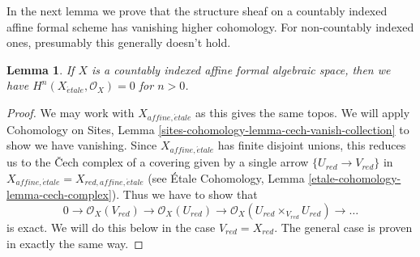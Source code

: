 \documentclass{stacks-project}
\theoremstyle{plain}
\newtheorem{lemma}[subsection]{Lemma}
\theoremstyle{definition}
\theoremstyle{remark}
\numberwithin{equation}{subsection}
\def\etale{{\acute{e}tale}}
\begin{document}
\noindent
In the next lemma we prove that the structure sheaf on a countably
indexed affine formal scheme has vanishing higher cohomology.
For non-countably indexed ones, presumably this generally doesn't hold.

\begin{lemma}
\label{lemma-higher-vanishing-structure-sheaf}
If $X$ is a countably indexed affine formal algebraic space, then
we have $H^n(X_\etale, \mathcal{O}_X) = 0$ for $n > 0$.
\end{lemma}

\begin{proof}
We may work with $X_{affine, \etale}$ as this gives the same topos.
We will apply Cohomology on Sites, Lemma
\ref{sites-cohomology-lemma-cech-vanish-collection}
to show we have vanishing. Since $X_{affine, \etale}$
has finite disjoint unions, this reduces us to the {\v C}ech
complex of a covering given by a single arrow $\{U_{red} \to V_{red}\}$
in $X_{affine, \etale} = X_{red, affine, \etale}$
(see \'Etale Cohomology, Lemma \ref{etale-cohomology-lemma-cech-complex}).
Thus we have to show that
$$
0 \to \mathcal{O}_X(V_{red}) \to \mathcal{O}_X(U_{red}) \to
\mathcal{O}_X(U_{red} \times_{V_{red}} U_{red}) \to \ldots
$$
is exact. We will do this below in the case $V_{red} = X_{red}$.
The general case is proven in exactly the same way.


\end{proof}
\end{document}
